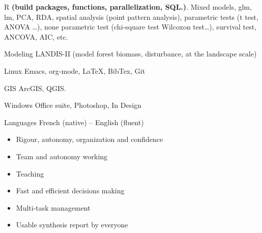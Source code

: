 



\begin{multicols}{2}[]
  \begin{cvskillscols}


  \cvskillscol
    {R } %
    {{\textnormal\textbf{(build packages, functions, parallelization, SQL.)}. Mixed models, glm, lm, PCA, RDA, spatial analysis (point pattern analysis), parametric tests (t test, ANOVA …), none parametric test (chi-square test Wilcoxon test…), survival test, ANCOVA, AIC, etc.}} %

  \cvskillscol
    {Modeling} %
    {LANDIS-II (model forest biomass, disturbance, at the landscape scale)} %

  \cvskillscol
    {Linux} %
    {Emacs, org-mode, LaTeX, BibTex, Git} %

  \cvskillscol
    {GIS} %
    {ArcGIS, QGIS.} %
    
  \cvskillscol
    {Windows} %
    {Office suite, Photoshop, In Design} %
    
  \cvskillscol
    {Languages} %
    {\textnormal{French (native) – English (fluent)}} %

\end{cvskillscols}

\columnbreak


\begin{itemize}[label={}]
\item {Rigour, autonomy, organization and confidence}
\item {Team and autonomy working}
\item {Teaching}
\item {Fast and efficient decisions making}
\item {Multi-task management}
\item {Usable synthesis report by everyone}
\end{itemize}
\end{multicols}

